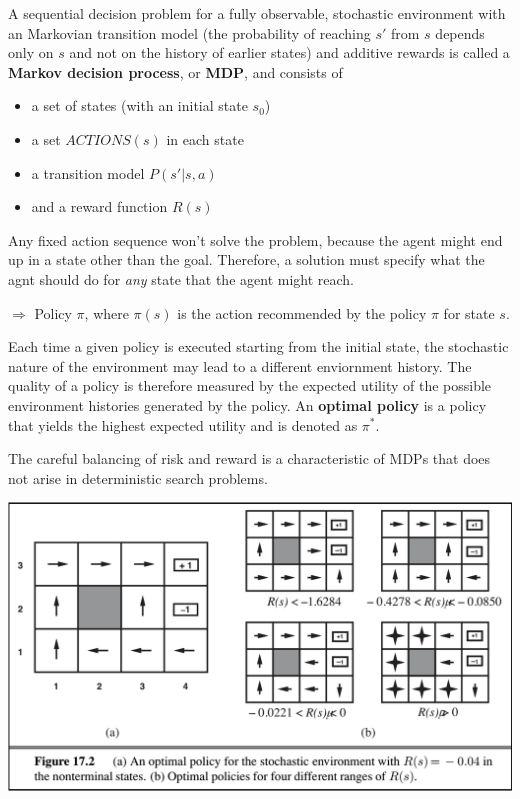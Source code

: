 \documentclass{scrartcl}
\begin{document}

A sequential decision problem for a fully observable, stochastic environment with an Markovian transition model (the probability of reaching \(s'\) from \(s\) depends only on \(s\) and not on the history of earlier states)
 and additive rewards is called a \textbf{Markov decision process}, or \textbf{MDP}, and consists of 
\begin{itemize}
    \item
        a set of states (with an initial state \(s_0\))        
    \item
        a set \(ACTIONS(s)\) in each state
    \item
        a transition model \(P(s'|s,a)\)
    \item
        and a reward function \(R(s)\)
\end{itemize}

\bigbreak

Any fixed action sequence won't solve the problem, because the agent might end up in a state other than the goal. Therefore, a solution must specify what the agnt should do for \textit{any} state that the agent might reach. 

\(\Rightarrow\) Policy \(\pi\), where \(\pi(s)\) is the action recommended by the policy \(\pi\) for state \(s\).

Each time a given policy is executed starting from the initial state, the stochastic nature of the environment may lead to a different enviornment history. The quality of a policy is therefore measured by the expected utility of the possible environment histories generated by the policy. An \textbf{optimal policy} is a policy that yields the highest expected utility and is denoted as \(\pi^*\).

The careful balancing of risk and reward is a characteristic of MDPs that does not arise in deterministic search problems.

\begin{center}
    \includegraphics[scale=0.4]{img/4x3cont.png}
\end{center}
\end{document}
